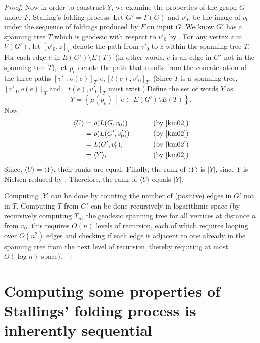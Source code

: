 \documentclass{article}
\newcommand{\gen}[1]{\langle #1 \rangle}
\begin{document}
\begin{proof}
  Now in order to construct $Y$, we examine the properties of the graph $G$ under $F$, Stalling's folding process.
  Let $G' = F(G)$ and $v'_0$ be the image of $v_0$ under the sequence of foldings produced by $F$ on input $G$.
  We know $G'$ has a spanning tree $T$ which is geodesic with respect to $v'_0$ by \cite[Lemma~6.6]{km02}.
  For any vertex $z$ in $V(G')$, let $[v'_0, z]_T$ denote the path from $v'_0$ to $z$ within the spanning tree $T$.
  For each edge $e$ in $E(G') \setminus E(T)$ (in other words, $e$ is an edge in $G'$ not in the spanning tree $T$), let $p_e$ denote the path that results from the concatenation of the three paths $[v'_0, o(e)]_T, e, [t(e), v'_0]_T$.
  (Since $T$ is a spanning tree, $[v'_0, o(e)]_T$ and $[t(e), v'_0]_T$ must exist.)
  Define the set of words $Y$ as
  \begin{equation*}
    Y = \left\{\mu(p_e) \, \middle| \, e \in E(G') \setminus E(T) \right\}.
  \end{equation*}
  Now
  \begin{align*}
    \gen{U} & = \rho(L(G, v_0)) & \qquad \text{ (by \cite[Proposition~3.8]{km02})} \\
            & = \rho(L(G', v'_0)) & \qquad \text{ (by \cite[Lemma~3.4]{km02})} \\
            & = L(G', v'_0), & \qquad \text{ (by \cite[Lemma~2.9]{km02})} \\
            & = \gen{Y}, & \qquad \text{ (by \cite[Lemma~6.1]{km02})}
  \end{align*}
  Since, $\gen{U} = \gen{Y}$, their ranks are equal.
  Finally, the rank of $\gen{Y}$ is $|Y|$, since $Y$ is Nielsen reduced by \cite[Proposition~6.7]{km02}.
  Therefore, the rank of $\gen{U}$ equals $|Y|$.

  Computing $|Y|$ can be done by counting the number of (positive) edges in $G'$ not in $T$.
  Computing $T$ from $G'$ can be done recursively in logarithmic space (by recursively computing $T_n$, the geodesic spanning tree for all vertices at distance $n$ from $v_0$; this requires $O(n)$ levels of recursion, each of which requires looping over $O(n^2)$ edges and checking if each edge is adjacent to one already in the spanning tree from the next level of recursion, thereby requiring at most $O(\log n)$ space).
\end{proof}

\section{Computing some properties of Stallings' folding process is inherently sequential}
\end{document}
